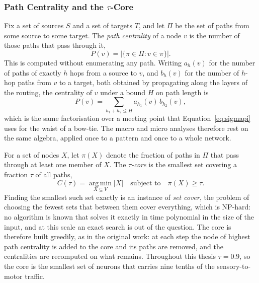 \documentclass[12pt,a4paper,oneside]{article}
\theoremstyle{definition}
\theoremstyle{plain}
\begin{document}
\subsubsection{Path Centrality and the \texorpdfstring{$\tau$}{tau}-Core}
\label{sec:taucore-def}

Fix a set of sources $S$ and a set of targets $T$, and let $\Pi$ be the set
of paths from some source to some target. The \emph{path centrality} of a
node $v$ is the number of those paths that pass through it,
\begin{equation}
  \label{eq:path-centrality}
  P(v) = \bigl| \{\pi \in \Pi : v \in \pi\} \bigr|.
\end{equation}
This is computed without enumerating any path. Writing $a_h(v)$ for the
number of paths of exactly $h$ hops from a source to $v$, and $b_h(v)$ for
the number of $h$-hop paths from $v$ to a target, both obtained by
propagating along the layers of the routing, the centrality of $v$ under a
bound $H$ on path length is
\begin{equation}
  \label{eq:centrality-factorised}
  P(v) = \sum_{h_1 + h_2 \le H} a_{h_1}(v)\, b_{h_2}(v),
\end{equation}
which is the same factorisation over a meeting point that
Equation~\eqref{eq:sigmapi} uses for the waist of a bow-tie. The macro and
micro analyses therefore rest on the same algebra, applied once to a pattern
and once to a whole network.

For a set of nodes $X$, let $\pi(X)$ denote the fraction of paths in $\Pi$
that pass through at least one member of $X$. The \emph{$\tau$-core} is the
smallest set covering a fraction $\tau$ of all paths,
\begin{equation}
  \label{eq:taucore}
  C(\tau) = \operatorname*{arg\,min}_{X \subseteq V} |X|
  \quad \text{subject to} \quad \pi(X) \ge \tau .
\end{equation}
Finding the smallest such set exactly is an instance of \emph{set cover},
the problem of choosing the fewest sets that between them cover everything,
which is NP-hard: no algorithm is known that solves it exactly in time
polynomial in the size of the input, and at this scale an exact search is
out of the question. The core is therefore built greedily, as in the
original work: at each step the node of highest
path centrality is added to the core and its paths are removed, and the
centralities are recomputed on what remains. Throughout this thesis
$\tau = 0.9$, so the core is the smallest set of neurons that carries nine
tenths of the sensory-to-motor traffic.
\end{document}
